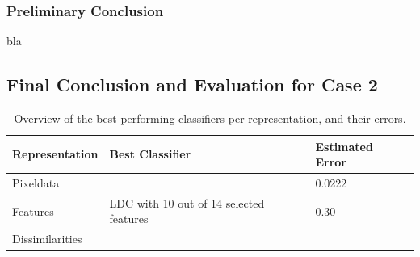 \subsubsection*{Preliminary Conclusion}
bla

\subsection{Final Conclusion and Evaluation for Case 2}
\begin{table}[H]
	\centering
	\caption{Overview of the best performing classifiers per representation, and their errors.}
	\label{tab:concase1}
	\begin{tabular}{l|ll}
		Representation  & Best Classifier               & Estimated Error \\ \hline
		Pixeldata       &  & 0.0222          \\
		Features        & LDC with 10 out of 14 selected features                      & 0.30          \\
		Dissimilarities &                            &          
	\end{tabular}
\end{table}
